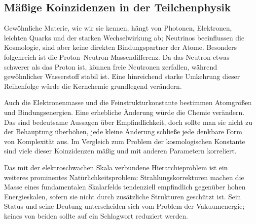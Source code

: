 \subsection{Mäßige Koinzidenzen in der Teilchenphysik}

Gewöhnliche Materie, wie wir sie kennen, hängt von Photonen, Elektronen, leichten Quarks und der starken Wechselwirkung ab; Neutrinos beeinflussen die Kosmologie, sind aber keine direkten Bindungspartner der Atome. Besonders folgenreich ist die Proton--Neutron-Massendifferenz. Da das Neutron etwas schwerer als das Proton ist, können freie Neutronen zerfallen, während gewöhnlicher Wasserstoff stabil ist. Eine hinreichend starke Umkehrung dieser Reihenfolge würde die Kernchemie grundlegend verändern.

Auch die Elektronenmasse und die Feinstrukturkonstante bestimmen Atomgrößen und Bindungsenergien. Eine erhebliche Änderung würde die Chemie verändern. Das sind bedeutsame Aussagen über Empfindlichkeit, doch sollte man sie nicht zu der Behauptung überhöhen, jede kleine Änderung schließe jede denkbare Form von Komplexität aus. Im Vergleich zum Problem der kosmologischen Konstante sind viele dieser Koinzidenzen mäßig und mit anderen Parametern korreliert.

Das mit der elektroschwachen Skala verbundene Hierarchieproblem ist ein weiteres prominentes Natürlichkeitsproblem: Strahlungskorrekturen machen die Masse eines fundamentalen Skalarfelds tendenziell empfindlich gegenüber hohen Energieskalen, sofern sie nicht durch zusätzliche Strukturen geschützt ist. Sein Status und seine Deutung unterscheiden sich vom Problem der Vakuumenergie; keines von beiden sollte auf ein Schlagwort reduziert werden.

\begin{classroomqa}
\end{classroomqa}

\begin{classroomqa}
\end{classroomqa}

